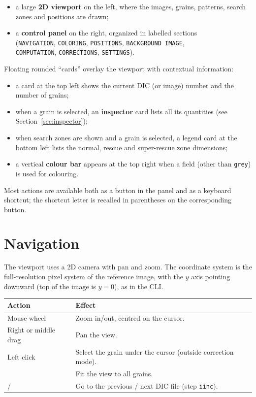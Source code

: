 \documentclass{simpledoc}
\newcommand{\scr}[1]{\texttt{\color{myblue}#1}}
\newcommand{\key}[1]{\fbox{\color{myblue}#1}}
\begin{document}
\begin{itemize}
  \item a large \textbf{2D viewport} on the left, where the images, grains, patterns, search zones and
        positions are drawn;
  \item a \textbf{control panel} on the right, organized in labelled sections\\ (\scr{NAVIGATION},
        \scr{COLORING}, \scr{POSITIONS}, \scr{BACKGROUND IMAGE},\\ \scr{COMPUTATION}, \scr{CORRECTIONS},
        \scr{SETTINGS}).
\end{itemize}

Floating rounded ``cards'' overlay the viewport with contextual information:

\begin{itemize}
  \item a card at the top left shows the current DIC (or image) number and the number of grains;
  \item when a grain is selected, an \textbf{inspector} card lists all its quantities (see
        Section~\ref{sec:inspector});
  \item when search zones are shown and a grain is selected, a legend card at the bottom left lists the
        normal, rescue and super-rescue zone dimensions;
  \item a vertical \textbf{colour bar} appears at the top right when a field (other than \scr{grey}) is
        used for colouring.
\end{itemize}

Most actions are available both as a button in the panel and as a keyboard shortcut; the shortcut
letter is recalled in parentheses on the corresponding button.

\section{Navigation}
\label{sec:navigation}

The viewport uses a 2D camera with pan and zoom. The coordinate system is the full-resolution pixel
system of the reference image, with the $y$ axis pointing downward (top of the image is $y=0$), as in
the CLI.

\begin{center}
\begin{tabular}{lp{7cm}}
\hline
\textbf{Action} & \textbf{Effect} \\
\hline
Mouse wheel              & Zoom in/out, centred on the cursor. \\
Right or middle drag     & Pan the view. \\
Left click               & Select the grain under the cursor (outside correction mode). \\
\key{F}                  & Fit the view to all grains. \\
\key{$\leftarrow$} / \key{$\rightarrow$} & Go to the previous / next DIC file (step \scr{iinc}). \\
\hline
\end{tabular}
\end{center}
\end{document}
